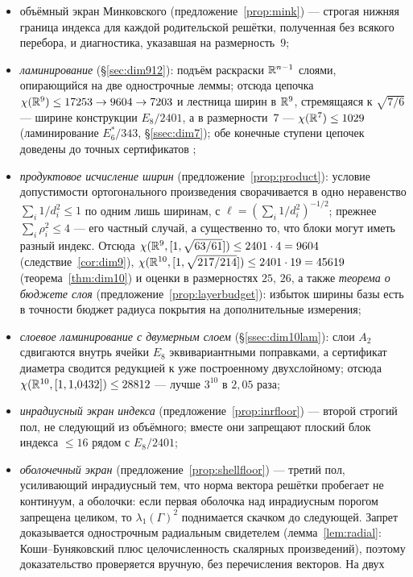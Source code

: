 \begin{itemize}[leftmargin=1.4em,itemsep=1pt]
$5$--$9$, не трактуемые как доказательства невозможности;
\item объёмный экран Минковского (предложение~\ref{prop:mink}) --- строгая
нижняя граница индекса для каждой родительской решётки, полученная без всякого
перебора, и диагностика, указавшая на размерность~$9$;
\item \emph{ламинирование} (\S\ref{sec:dim912}): подъём раскраски $\mathbb{R}^{n-1}$
слоями, опирающийся на две одностроч\-ные леммы; отсюда цепочка
$\chi(\mathbb{R}^9)\le17253\to9604\to7203$ и лестница ширин в $\mathbb{R}^9$, стремящаяся к
$\sqrt{7/6}$ --- ширине конструкции $E_8/2401$, а в размерности~$7$ ---
$\chi(\mathbb{R}^7)\le1029$ (ламинирование $E_6^*/343$, \S\ref{ssec:dim7}); обе
конечные ступени цепочек доведены до точных сертификатов \stC;
\item \emph{продуктовое исчисление ширин} (предложение~\ref{prop:product}):
условие допустимости ортогонального произведения сворачивается в одно
неравенство $\sum_i 1/d_i^2\le1$ по одним лишь ширинам, с
$\ell=(\sum_i 1/d_i^2)^{-1/2}$; прежнее $\sum_i\rho_i^2\le4$ --- его частный
случай, а существенно то, что блоки могут иметь разный индекс. Отсюда
$\chi(\mathbb{R}^9,[1,\sqrt{63/61}])\le2401\cdot4=9604$ (следствие~\ref{cor:dim9}),
$\chi(\mathbb{R}^{10},[1,\sqrt{217/214}])\le2401\cdot19=45619$
(теорема~\ref{thm:dim10}) и оценки в размерностях $25$, $26$, а также
\emph{теорема о бюджете слоя} (предложение~\ref{prop:layerbudget}):
избыток ширины базы есть в точности бюджет радиуса покрытия на дополнительные
измерения;
\item \emph{слоевое ламинирование с двумерным слоем} (\S\ref{ssec:dim10lam}):
слои $A_2$ сдвигаются внутрь ячейки $E_8$ эквивариантными поправками, а
сертификат диаметра сводится редукцией к уже построенному двухслойному;
отсюда $\chi(\mathbb{R}^{10},[1,1{,}0432])\le28812$ --- лучше $3^{10}$ в $2{,}05$
раза;
\item \emph{инрадиусный экран индекса} (предложение~\ref{prop:inrfloor}) ---
второй строгий пол, не следующий из объёмного; вместе они запрещают плоский
блок индекса $\le16$ рядом с $E_8/2401$;
\item \emph{оболочечный экран} (предложение~\ref{prop:shellfloor}) --- третий
пол, усиливающий инрадиусный тем, что норма вектора решётки пробегает не
континуум, а оболочки: если первая оболочка над инрадиусным порогом запрещена
целиком, то $\lambda_1(\Gamma)^2$ поднимается скачком до следующей. Запрет
доказывается однострочным радиальным свидетелем (лемма~\ref{lem:radial}:
Коши--Буняковский плюс целочисленность скалярных произведений), поэтому
доказательство проверяется вручную, без перечисления векторов. На двух

\end{itemize}
